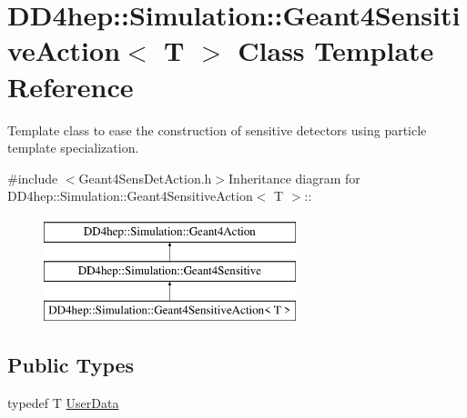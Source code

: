 \hypertarget{class_d_d4hep_1_1_simulation_1_1_geant4_sensitive_action}{
\section{DD4hep::Simulation::Geant4SensitiveAction$<$ T $>$ Class Template Reference}
\label{class_d_d4hep_1_1_simulation_1_1_geant4_sensitive_action}
}


Template class to ease the construction of sensitive detectors using particle template specialization.  


{\ttfamily \#include $<$Geant4SensDetAction.h$>$}Inheritance diagram for DD4hep::Simulation::Geant4SensitiveAction$<$ T $>$::\begin{figure}[H]
\begin{center}
\leavevmode
\includegraphics[height=3cm]{class_d_d4hep_1_1_simulation_1_1_geant4_sensitive_action}
\end{center}
\end{figure}
\subsection*{Public Types}
\begin{DoxyCompactItemize}
\item 
typedef T \hyperlink{class_d_d4hep_1_1_simulation_1_1_geant4_sensitive_action_a1aa349c02363cf7471a043ad5f3b95c9}{UserData}
\end{DoxyCompactItemize}
